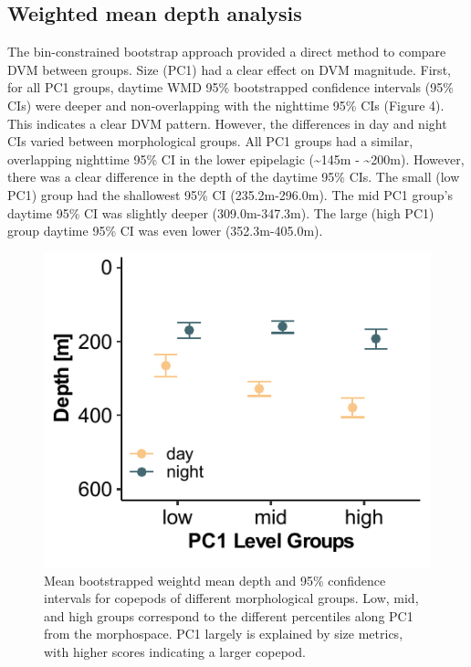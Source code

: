 \documentclass[
]{article}
\begin{document}
\hypertarget{weighted-mean-depth-analysis}{%
\subsection{Weighted mean depth
analysis}\label{weighted-mean-depth-analysis}}

The bin-constrained bootstrap approach provided a direct method to
compare DVM between groups. Size (PC1) had a clear effect on DVM
magnitude. First, for all PC1 groups, daytime WMD 95\% bootstrapped
confidence intervals (95\% CIs) were deeper and non-overlapping with the
nighttime 95\% CIs (Figure 4). This indicates a clear DVM pattern.
However, the differences in day and night CIs varied between
morphological groups. All PC1 groups had a similar, overlapping
nighttime 95\% CI in the lower epipelagic (\textasciitilde145m -
\textasciitilde200m). However, there was a clear difference in the depth
of the daytime 95\% CIs. The small (low PC1) group had the shallowest
95\% CI (235.2m-296.0m). The mid PC1 group's daytime 95\% CI was
slightly deeper (309.0m-347.3m). The large (high PC1) group daytime 95\%
CI was even lower (352.3m-405.0m).

\begin{figure}

{\centering \includegraphics{../media/figure_04.pdf}

}

\caption{Mean bootstrapped weightd mean depth and 95\% confidence
intervals for copepods of different morphological groups. Low, mid, and
high groups correspond to the different percentiles along PC1 from the
morphospace. PC1 largely is explained by size metrics, with higher
scores indicating a larger copepod.}

\end{figure}
\end{document}
